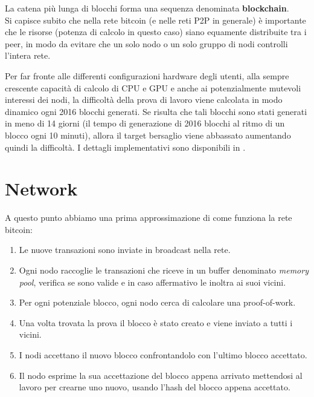 La catena più lunga di blocchi forma una sequenza denominata \textbf{blockchain}.\\

Si capisce subito che nella rete bitcoin (e nelle reti P2P in generale) è importante che le risorse (potenza di calcolo in questo caso) siano equamente distribuite tra i peer, in modo da evitare che un solo nodo o un solo gruppo di nodi controlli l'intera rete.

Per far fronte alle differenti configurazioni hardware degli utenti, alla sempre crescente capacità di calcolo di CPU e GPU e anche ai potenzialmente mutevoli interessi dei nodi, la difficoltà della prova di lavoro viene calcolata in modo dinamico ogni 2016 blocchi generati. Se risulta che tali blocchi sono stati generati in meno di 14 giorni (il tempo di generazione di 2016 blocchi al ritmo di un blocco ogni 10 minuti), allora il target bersaglio viene abbassato aumentando quindi la difficoltà. I dettagli implementativi sono disponibili in \cite{bitcoin-target,bitcoin-proofofwork,bitcoin-difficulty}.

\section{Network}\label{network}

A questo punto abbiamo una prima approssimazione di come funziona la rete bitcoin:

\begin{enumerate}
\def\labelenumi{\arabic{enumi}.}
\itemsep1pt\parskip0pt
\item
  Le nuove transazioni sono inviate in broadcast nella rete.
\item
  Ogni nodo raccoglie le transazioni che riceve in un buffer denominato \emph{memory pool}, verifica se sono valide e in caso affermativo le inoltra ai suoi vicini.
\item
  Per ogni potenziale blocco, ogni nodo cerca di calcolare una proof-of-work.
\item
  Una volta trovata la prova il blocco è stato creato e viene inviato a tutti i vicini.
\item
  I nodi accettano il nuovo blocco confrontandolo con l'ultimo blocco accettato.
\item
  Il nodo esprime la sua accettazione del blocco appena arrivato   mettendosi al lavoro per crearne uno nuovo, usando l'hash del blocco appena accettato.
\end{enumerate}

